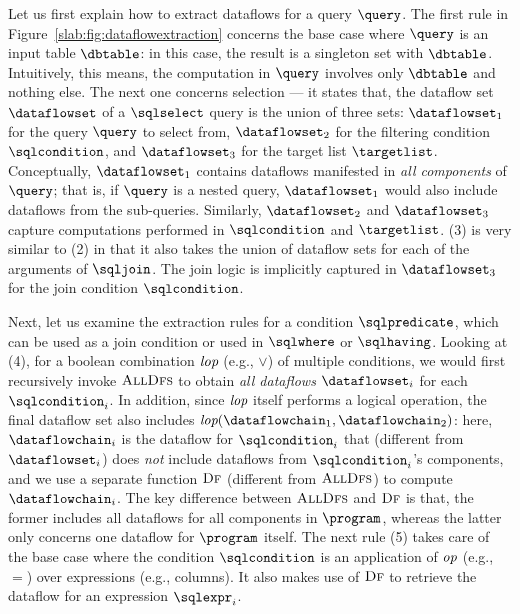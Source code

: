 Let us first explain how to extract dataflows for a query $\query$. 
The first rule in Figure~\ref{slab:fig:dataflowextraction} concerns the base case where $\query$ is an input table $\dbtable$: in this case, the result is a singleton set with $\dbtable$. Intuitively, this means, the computation in $\query$ involves only $\dbtable$ and nothing else. 
The next one concerns selection --- it states that, the dataflow set $\dataflowset$ of a $\sqlselect$ query is the union of three sets: $\dataflowset_1$ for the query $\query$ to select from, $\dataflowset_2$ for the filtering condition $\sqlcondition$, and $\dataflowset_3$ for the target list $\targetlist$. Conceptually, $\dataflowset_1$ contains dataflows manifested in \emph{all components} of $\query$; that is, if $\query$ is a nested query, $\dataflowset_1$ would also include dataflows from the sub-queries. 
Similarly, $\dataflowset_2$ and $\dataflowset_3$ capture computations performed in $\sqlcondition$ and $\targetlist$. 
(3) is very similar to (2) in that it also takes the union of dataflow sets for each of the arguments of $\sqljoin$. The join logic is implicitly captured in  $\dataflowset_3$ for the join condition $\sqlcondition$.

Next, let us examine the extraction rules for a condition $\sqlpredicate$, which can be used as a join condition or used in $\sqlwhere$ or $\sqlhaving$. 
Looking at (4), for a boolean combination $\emph{lop}$ (e.g., $\lor$) of multiple conditions, we would first recursively invoke $\textsc{AllDfs}$ to obtain \emph{all dataflows} $\dataflowset_i$ for each $\sqlcondition_i$. In addition, since $\emph{lop}$ itself performs a logical operation, the final dataflow set also includes $\emph{lop}(\dataflowchain_1, \dataflowchain_2)$: here, $\dataflowchain_i$ is the dataflow for $\sqlcondition_i$ that (different from $\dataflowset_i$) does \emph{not} include dataflows from $\sqlcondition_i$'s components, and we use a separate function $\textsc{Df}$ (different from $\textsc{AllDfs}$) to compute $\dataflowchain_i$. The key difference between $\textsc{AllDfs}$ and $\textsc{Df}$ is that, the former includes all dataflows for all components in $\program$, whereas the latter only concerns one dataflow for $\program$ itself. The next rule (5) takes care of the base case where the condition $\sqlcondition$ is an application of $\emph{op}$ (e.g., $=$) over expressions (e.g., columns). It also makes use of $\textsc{Df}$ to retrieve the dataflow for an expression $\sqlexpr_i$. 

